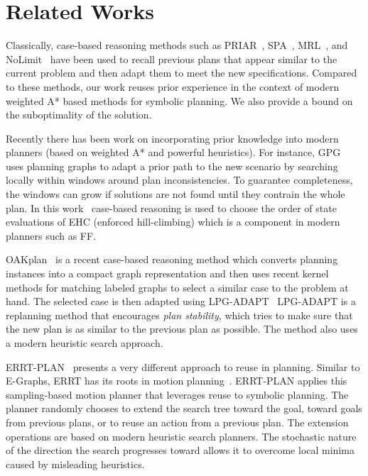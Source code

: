 \documentclass[letterpaper]{article}
\begin{document}
\section{Related Works}

Classically, case-based reasoning methods 
such as PRIAR~\cite{Kamb:92}, SPA~\cite{Hank:95}, MRL~\cite{Koeh:94}, and NoLimit~\cite{mljournal}
have been used to recall 
previous plans that appear similar to the current problem and 
then adapt them to meet the new specifications.
Compared to these methods, our work reuses prior experience in
the context of modern weighted A* based methods for symbolic planning. We also provide
a bound on the suboptimality of the solution.

Recently there has been work on incorporating prior knowledge 
into modern planners (based on weighted A* and powerful heuristics).
For instance, GPG~\cite{Gere:00} uses planning graphs to adapt a prior path to the 
new scenario by searching locally within windows around plan 
inconsistencies. To guarantee completeness, the windows can grow 
if solutions are not found until they contrain the whole plan.
In this work~\cite{DBLP:conf/iccbr/RosaOB07} case-based reasoning is used to choose the 
order of state evaluations of EHC (enforced hill-climbing) which 
is a component in modern planners such as FF. 

OAKplan~\cite{Serina:2010:KFC:1860143.1860472} is a recent 
case-based reasoning method which converts 
planning instances into a compact graph representation and 
then uses recent kernel methods for matching labeled graphs to select
a similar case to the problem at hand. The selected case is then 
adapted using LPG-ADAPT~\cite{Fox06planstability} LPG-ADAPT is a replanning method
that encourages \textit{plan stability}, which tries to make 
sure that the new plan is as similar to the previous plan as possible. 
The method also uses a modern heuristic search approach.

ERRT-PLAN~\cite{workshop-icaps12-errtplan} presents a very different 
approach to reuse in planning. 
Similar to E-Graphs, ERRT has its roots in motion planning~\cite{Bruce:2002}.
ERRT-PLAN applies this sampling-based motion planner that leverages 
reuse to symbolic planning. The planner randomly chooses to extend 
the search tree toward the goal, toward goals from previous 
plans, or to reuse an action from a previous plan. 
The extension operations are based on modern heuristic search
planners.
The stochastic nature of the direction the search progresses toward
allows it to overcome local minima caused by misleading heuristics.
\end{document}

